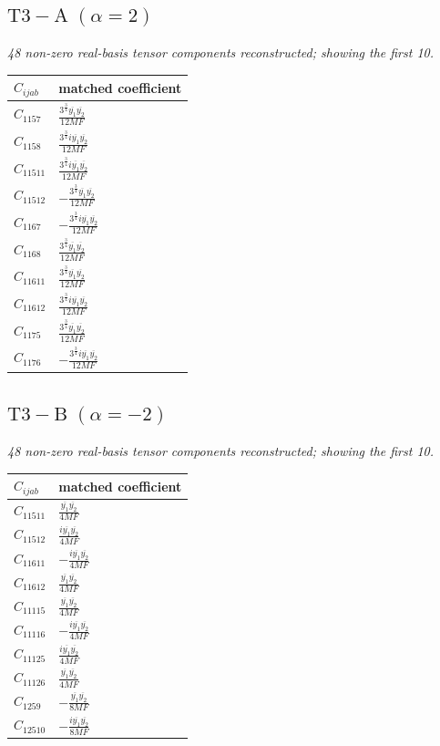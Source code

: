 \documentclass[9pt]{article}
\begin{document}
\subsection*{$ \mathrm{T3-A}\;(\alpha=2) $}
\textit{48 non-zero real-basis tensor components reconstructed; showing the first 10.}
\begin{longtable}{@{}ll@{}}
\toprule
$C_{ijab}$ & matched coefficient \\
\midrule
$C_{1157}$ & $ \frac{3^{\frac{3}{4}} \overline{y_{1}} \overline{y_{2}}}{12 MF} $ \\
$C_{1158}$ & $ \frac{3^{\frac{3}{4}} i \overline{y_{1}} \overline{y_{2}}}{12 MF} $ \\
$C_{11511}$ & $ \frac{3^{\frac{3}{4}} i \overline{y_{1}} \overline{y_{2}}}{12 MF} $ \\
$C_{11512}$ & $ - \frac{3^{\frac{3}{4}} \overline{y_{1}} \overline{y_{2}}}{12 MF} $ \\
$C_{1167}$ & $ - \frac{3^{\frac{3}{4}} i \overline{y_{1}} \overline{y_{2}}}{12 MF} $ \\
$C_{1168}$ & $ \frac{3^{\frac{3}{4}} \overline{y_{1}} \overline{y_{2}}}{12 MF} $ \\
$C_{11611}$ & $ \frac{3^{\frac{3}{4}} \overline{y_{1}} \overline{y_{2}}}{12 MF} $ \\
$C_{11612}$ & $ \frac{3^{\frac{3}{4}} i \overline{y_{1}} \overline{y_{2}}}{12 MF} $ \\
$C_{1175}$ & $ \frac{3^{\frac{3}{4}} \overline{y_{1}} \overline{y_{2}}}{12 MF} $ \\
$C_{1176}$ & $ - \frac{3^{\frac{3}{4}} i \overline{y_{1}} \overline{y_{2}}}{12 MF} $ \\
\bottomrule
\end{longtable}
\subsection*{$ \mathrm{T3-B}\;(\alpha=-2) $}
\textit{48 non-zero real-basis tensor components reconstructed; showing the first 10.}
\begin{longtable}{@{}ll@{}}
\toprule
$C_{ijab}$ & matched coefficient \\
\midrule
$C_{11511}$ & $ \frac{\overline{y_{1}} \overline{y_{2}}}{4 MF} $ \\
$C_{11512}$ & $ \frac{i \overline{y_{1}} \overline{y_{2}}}{4 MF} $ \\
$C_{11611}$ & $ - \frac{i \overline{y_{1}} \overline{y_{2}}}{4 MF} $ \\
$C_{11612}$ & $ \frac{\overline{y_{1}} \overline{y_{2}}}{4 MF} $ \\
$C_{11115}$ & $ \frac{\overline{y_{1}} \overline{y_{2}}}{4 MF} $ \\
$C_{11116}$ & $ - \frac{i \overline{y_{1}} \overline{y_{2}}}{4 MF} $ \\
$C_{11125}$ & $ \frac{i \overline{y_{1}} \overline{y_{2}}}{4 MF} $ \\
$C_{11126}$ & $ \frac{\overline{y_{1}} \overline{y_{2}}}{4 MF} $ \\
$C_{1259}$ & $ - \frac{\overline{y_{1}} \overline{y_{2}}}{8 MF} $ \\
$C_{12510}$ & $ - \frac{i \overline{y_{1}} \overline{y_{2}}}{8 MF} $ \\
\bottomrule
\end{longtable}
\end{document}
